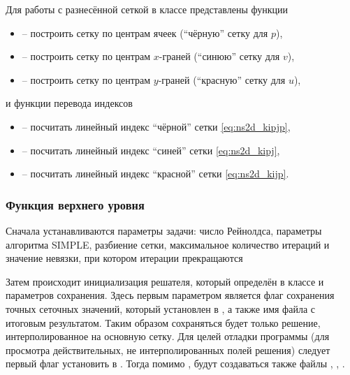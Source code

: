 Для работы с разнесённой сеткой в классе 
представлены функции
\begin{itemize}
\item {}  -- построить сетку по центрам ячеек (``чёрную'' сетку для $p$),
\item {} -- построить сетку по центрам $x$-граней (``синюю'' сетку для $v$),
\item {} -- построить сетку по центрам $y$-граней (``красную'' сетку для $u$),
\end{itemize}

и функции перевода индексов
\begin{itemize}
\item {} -- посчитать линейный индекс ``чёрной'' сетки \eqref{eq:ns2d_kipjp},
\item {} -- посчитать линейный индекс ``синей'' сетки \eqref{eq:ns2d_kipj},
\item {} -- посчитать линейный индекс ``красной'' сетки \eqref{eq:ns2d_kijp}.
\end{itemize}

\subsubsection{Функция верхнего уровня}

Сначала устанавливаются параметры задачи:
число Рейнолдса,
параметры алгоритма SIMPLE,
разбиение сетки, 
максимальное количество итераций 
и значение невязки, при котором итерации прекращаются

Затем происходит инициализация решателя, который
определён в классе 
и параметров сохранения. Здесь
первым параметром является флаг сохранения
точных сеточных значений, который установлен в ,
а также имя файла с итоговым результатом.
Таким образом сохраняться будет только решение,
интерполированное на основную сетку.
Для целей отладки программы (для просмотра действительных, не интерполированных полей решения)
следует первый флаг установить в . Тогда помимо , будут
создаваться также файлы , , .

